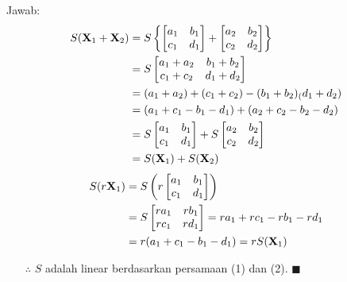 \documentclass[12pt, a4paper]{scrartcl}
\begin{document}
\begin{enumerate}
\begin{enumerate}
            Jawab:
            \begin{align}
                S(\textbf{X}_1 + \textbf{X}_2) &=S\left\{\begin{bmatrix}
                    a_1&b_1\\c_1&d_1
                \end{bmatrix}+\begin{bmatrix}
                    a_2&b_2\\c_2&d_2
                \end{bmatrix}\right\}\notag\\ &=S\begin{bmatrix}
                    a_1+a_2&b_1+b_2\\c_1+c_2&d_1+d_2
                \end{bmatrix}\notag\\ &=(a_1+a_2)+(c_1+c_2)-(b_1+b_2)_(d_1+d_2)
                \notag\\ &= (a_1+c_1-b_1-d_1)+(a_2+c_2-b_2-d_2)
                \notag\\ &= S\begin{bmatrix}
                    a_1&b_1\\c_1&d_1
                \end{bmatrix}+S\begin{bmatrix}
                    a_2&b_2\\c_2&d_2
                \end{bmatrix} \notag\\ &= S(\textbf{X}_1)+S(\textbf{X}_2)
            \end{align}
            \begin{align}
                S(r\textbf{X}_1) &=S\left(r\begin{bmatrix}
                    a_1&b_1\\c_1&d_1
                \end{bmatrix}\right) \notag\\ &=S\begin{bmatrix}
                    ra_1&rb_1\\rc_1&rd_1
                \end{bmatrix} = ra_1+rc_1-rb_1-rd_1 \notag\\ &=r(a_1+c_1-b_1-d_1) =rS(\textbf{X}_1)
            \end{align}
            \begin{itemize}
                \item[$\therefore$] $S$ adalah linear berdasarkan persamaan (1) dan (2). $\blacksquare$
            \end{itemize}


\end{enumerate}
\end{enumerate}
\end{document}
